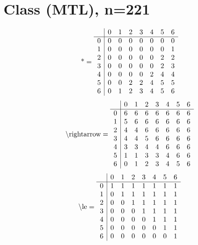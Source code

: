 \documentclass[11pt]{article}
\begin{document}
\section{Class (MTL), n=221}
\[\text{*} = 
\begin{array}{r | r r r r r r r}
 & 0 & 1 & 2 & 3 & 4 & 5 & 6 \\ \hline
0 & 0 & 0 & 0 & 0 & 0 & 0 & 0 \\
1 & 0 & 0 & 0 & 0 & 0 & 0 & 1 \\
2 & 0 & 0 & 0 & 0 & 0 & 2 & 2 \\
3 & 0 & 0 & 0 & 0 & 0 & 2 & 3 \\
4 & 0 & 0 & 0 & 0 & 2 & 4 & 4 \\
5 & 0 & 0 & 2 & 2 & 4 & 5 & 5 \\
6 & 0 & 1 & 2 & 3 & 4 & 5 & 6 \\
\end{array}
\]
\[\text{\textbackslash rightarrow} = 
\begin{array}{r | r r r r r r r}
 & 0 & 1 & 2 & 3 & 4 & 5 & 6 \\ \hline
0 & 6 & 6 & 6 & 6 & 6 & 6 & 6 \\
1 & 5 & 6 & 6 & 6 & 6 & 6 & 6 \\
2 & 4 & 4 & 6 & 6 & 6 & 6 & 6 \\
3 & 4 & 4 & 5 & 6 & 6 & 6 & 6 \\
4 & 3 & 3 & 4 & 4 & 6 & 6 & 6 \\
5 & 1 & 1 & 3 & 3 & 4 & 6 & 6 \\
6 & 0 & 1 & 2 & 3 & 4 & 5 & 6 \\
\end{array}
\]
\[\text{\textbackslash le} = 
\begin{array}{r | r r r r r r r}
 & 0 & 1 & 2 & 3 & 4 & 5 & 6 \\ \hline
0 & 1 & 1 & 1 & 1 & 1 & 1 & 1 \\
1 & 0 & 1 & 1 & 1 & 1 & 1 & 1 \\
2 & 0 & 0 & 1 & 1 & 1 & 1 & 1 \\
3 & 0 & 0 & 0 & 1 & 1 & 1 & 1 \\
4 & 0 & 0 & 0 & 0 & 1 & 1 & 1 \\
5 & 0 & 0 & 0 & 0 & 0 & 1 & 1 \\
6 & 0 & 0 & 0 & 0 & 0 & 0 & 1 \\
\end{array}
\]
\end{document}
